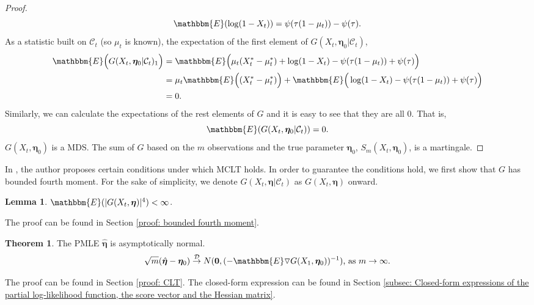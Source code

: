\documentclass{article}
\theoremstyle{definition}
\newtheorem{theorem}{Theorem}[section]
\newtheorem{lemma}{Lemma}[section]
\begin{document}
\begin{proof}
\begin{equation*}
    \mathbbm{E}(\log(1-X_t)) = \psi(\tau(1-\mu_t))-\psi(\tau).
\end{equation*}
As a statistic built on $\mathcal{C}_t$ (so $\mu_t$ is known), the expectation of the first element of $G(X_t, \bm{\eta}_0|\mathcal{C}_t)$,
\begin{equation*}
\begin{aligned}
    \mathbbm{E}\Big(G(X_t, \bm{\eta}_0|\mathcal{C}_t)_1\Big) &= \mathbbm{E}\Big(\mu_t(X_t^*-\mu_t^*)+\log(1-X_t)-\psi(\tau(1-\mu_t))+\psi(\tau)\Big) \\
    & =  \mu_t\mathbbm{E}\Big((X_t^*-\mu_t^*)\Big) + \mathbbm{E}\Big(\log(1-X_t)-\psi(\tau(1-\mu_t))+\psi(\tau)\Big) \\
    &= 0 .
\end{aligned}
\end{equation*}
Similarly, we can calculate the expectations of the rest elements of $G$ and it is easy to see that they are all 0. That is,
\begin{equation*}
    \mathbbm{E}(G(X_t, \bm{\eta}_0|\mathcal{C}_t)) = 0.
\end{equation*}
$G(X_t, \bm{\eta}_0)$ is a MDS. The sum of $G$ based on the $m$ observations and the true parameter $\bm{\eta}_0$, $S_m(X_t, \bm{\eta}_0)$, is a martingale.
\end{proof} 

In \cite{brown1971martingale}, the author proposes certain conditions under which MCLT holds. In order to guarantee the conditions hold, we first show that $G$ has bounded fourth moment. For the sake of simplicity, we denote $G(X_t,\bm{\eta}|\mathcal{C}_t)$ as $G(X_t,\bm{\eta})$ onward.
\begin{lemma}
\label{lemma: bounded fourth moment of G}
 $\mathbbm{E}(|G(X_t,\bm{\eta})|^4)<\infty$. 
\end{lemma}
 The proof can be found in Section \ref{proof: bounded fourth moment}.

\begin{theorem}
\label{theorem: CLT}
The PMLE $\hat{\bm{\eta}}$ is asymptotically normal.
\begin{equation*}
    \sqrt{m}(\hat{\bm{\eta}}-\bm{\eta}_0) \overset{\mathcal{D}}{\rightarrow} N(\bm{0},(-\mathbbm{E}\triangledown G(X_1,\bm{\eta}_0))^{-1})\text{, as } m \rightarrow \infty.
\end{equation*}
\end{theorem}
The proof can be found in Section \ref{proof: CLT}.
The closed-form expression can be found in Section \ref{subsec: Closed-form expressions of the partial log-likelihood function, the score vector and the Hessian matrix}.
\end{document}
